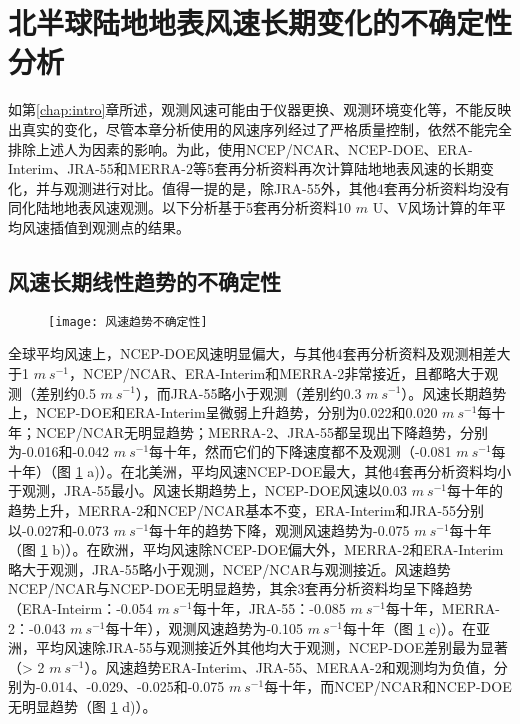 \section{北半球陆地地表风速长期变化的不确定性分析}

如第\ref{chap:intro}章所述，观测风速可能由于仪器更换、观测环境变化等，不能反映出真实的变化，尽管本章分析使用的风速序列经过了严格质量控制，依然不能完全排除上述人为因素的影响。为此，使用NCEP/NCAR、NCEP-DOE、ERA-Interim、JRA-55和MERRA-2等5套再分析资料再次计算陆地地表风速的长期变化，并与观测进行对比。值得一提的是，除JRA-55外，其他4套再分析资料均没有同化陆地地表风速观测。以下分析基于5套再分析资料10 $m$ U、V风场计算的年平均风速插值到观测点的结果。

\subsection{风速长期线性趋势的不确定性}

\begin{figure}[!t]
    \centering
    \texttt{[image: 风速趋势不确定性]}
    \label{fig:uncertaintywindtrend}
\end{figure}

全球平均风速上，NCEP-DOE风速明显偏大，与其他4套再分析资料及观测相差大于1 $m ~ s^{-1}$，NCEP/NCAR、ERA-Interim和MERRA-2非常接近，且都略大于观测（差别约0.5 $m ~ s^{-1}$），而JRA-55略小于观测（差别约0.3 $m ~ s^{-1}$）。风速长期趋势上，NCEP-DOE和ERA-Interim呈微弱上升趋势，分别为0.022和0.020 $m ~ s^{-1}$每十年；NCEP/NCAR无明显趋势；MERRA-2、JRA-55都呈现出下降趋势，分别为-0.016和-0.042 $m ~ s^{-1}$每十年，然而它们的下降速度都不及观测（-0.081 $m ~ s^{-1}$每十年）（图 \ref{fig:uncertaintywindtrend} a)）。在北美洲，平均风速NCEP-DOE最大，其他4套再分析资料均小于观测，JRA-55最小。风速长期趋势上，NCEP-DOE风速以0.03 $m ~ s^{-1}$每十年的趋势上升，MERRA-2和NCEP/NCAR基本不变，ERA-Interim和JRA-55分别以-0.027和-0.073 $m ~ s^{-1}$每十年的趋势下降，观测风速趋势为-0.075 $m ~ s^{-1}$每十年（图 \ref{fig:uncertaintywindtrend} b)）。在欧洲，平均风速除NCEP-DOE偏大外，MERRA-2和ERA-Interim略大于观测，JRA-55略小于观测，NCEP/NCAR与观测接近。风速趋势NCEP/NCAR与NCEP-DOE无明显趋势，其余3套再分析资料均呈下降趋势（ERA-Inteirm：-0.054 $m ~ s^{-1}$每十年，JRA-55：-0.085 $m ~ s^{-1}$每十年，MERRA-2：-0.043 $m ~ s^{-1}$每十年），观测风速趋势为-0.105 $m ~ s^{-1}$每十年（图 \ref{fig:uncertaintywindtrend} c)）。在亚洲，平均风速除JRA-55与观测接近外其他均大于观测，NCEP-DOE差别最为显著（> 2 $m ~ s^{-1}$）。风速趋势ERA-Interim、JRA-55、MERAA-2和观测均为负值，分别为-0.014、-0.029、-0.025和-0.075 $m ~ s^{-1}$每十年，而NCEP/NCAR和NCEP-DOE无明显趋势（图 \ref{fig:uncertaintywindtrend} d)）。


